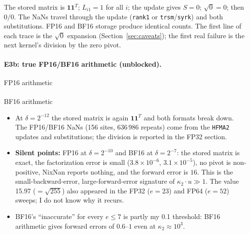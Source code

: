\documentclass[11pt,a4paper]{article}
\begin{document}
\begin{center}\scriptsize\end{center}

The stored matrix is $\mathbf{1}\mathbf{1}^T$; $L_{i1}=1$ for all $i$; the update gives $S=0$; $\sqrt{0}=0$; then $0/0$. The NaNs travel through the update (\texttt{rank1} or \texttt{trsm}/\texttt{syrk}) and both substitutions.
FP16 and BF16 storage produce identical counts. The first line of each trace is the $\sqrt0$ expansion (Section~\ref{sec:caveats}); the first real failure is the next kernel's division by the zero pivot.

\paragraph{E3b: true FP16/BF16 arithmetic (unblocked).}

\begin{center}\small
FP16 arithmetic\\[1mm]\\[3mm]
BF16 arithmetic\\[1mm]
\end{center}

\begin{center}\scriptsize\end{center}

\begin{itemize}
  \item At $\delta=2^{-12}$ the stored matrix is again $\mathbf{1}\mathbf{1}^T$ and both formats break down. The FP16/BF16 NaNs (156 sites, 636\,986 repeats) come from the \texttt{HFMA2} updates and substitutions; the division is reported in the FP32 section.
  \item \textbf{Silent points:} FP16 at $\delta=2^{-10}$ and BF16 at $\delta=2^{-7}$: the stored matrix is exact, the factorization error is small ($3.8\times10^{-6}$, $3.1\times10^{-5}$), no pivot is non-positive, NixNan reports nothing, and the forward error is $16$.
  This is the small-backward-error, large-forward-error signature of $\kappa_2\cdot u\gg1$. The value 15.97 ($=\sqrt{255}$) also appeared in the FP32 ($e=23$) and FP64 ($e=52$) sweeps; I do not know why it recurs.
  \item BF16's ``inaccurate'' for every $e\le7$ is partly my 0.1 threshold: BF16 arithmetic gives forward errors of $0.6$--$1$ even at $\kappa_2\approx10^3$.
\end{itemize}
\end{document}

